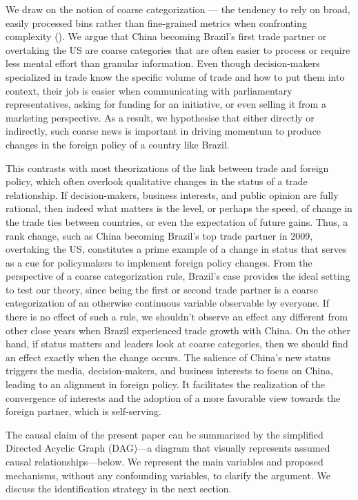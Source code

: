 \documentclass[
  12pt,
]{article}
\begin{document}
We draw on the notion of coarse categorization --- the tendency to rely
on broad, easily processed bins rather than fine-grained metrics when
confronting complexity (). We argue that China becoming Brazil's first trade
partner or overtaking the US are coarse categories that are often easier
to process or require less mental effort than granular information. Even
though decision-makers specialized in trade know the specific volume of
trade and how to put them into context, their job is easier when
communicating with parliamentary representatives, asking for funding for
an initiative, or even selling it from a marketing perspective. As a
result, we hypothesise that either directly or indirectly, such coarse
news is important in driving momentum to produce changes in the foreign
policy of a country like Brazil.

This contrasts with most theorizations of the link between trade and
foreign policy, which often overlook qualitative changes in the status
of a trade relationship. If decision-makers, business interests, and
public opinion are fully rational, then indeed what matters is the
level, or perhaps the speed, of change in the trade ties between
countries, or even the expectation of future gains. Thus, a rank change,
such as China becoming Brazil's top trade partner in 2009, overtaking
the US, constitutes a prime example of a change in status that serves as
a cue for policymakers to implement foreign policy changes. From the
perspective of a coarse categorization rule, Brazil's case provides the
ideal setting to test our theory, since being the first or second trade
partner is a coarse categorization of an otherwise continuous variable
observable by everyone. If there is no effect of such a rule, we
shouldn't observe an effect any different from other close years when
Brazil experienced trade growth with China. On the other hand, if status
matters and leaders look at coarse categories, then we should find an
effect exactly when the change occurs. The salience of China's new
status triggers the media, decision-makers, and business interests to
focus on China, leading to an alignment in foreign policy. It
facilitates the realization of the convergence of interests and the
adoption of a more favorable view towards the foreign partner, which is
self-serving.

The causal claim of the present paper can be summarized by the
simplified Directed Acyclic Graph (DAG)---a diagram that visually
represents assumed causal relationships---below. We represent the main
variables and proposed mechanisms, without any confounding variables, to
clarify the argument. We discuss the identification strategy in the next
section.
\end{document}
